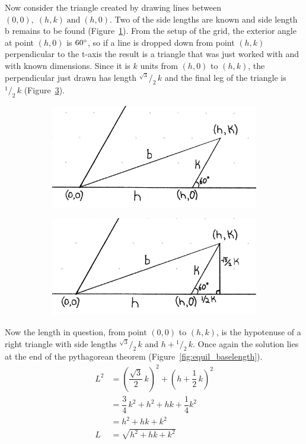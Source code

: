 \documentclass[12pt,letter]{article}
\newcommand*\rfrac[2]{{}^{#1}\!/_{#2}}
\begin{document}
Now consider the triangle created by drawing lines between $(0,0), \; (h,k) \; \text{and} \; (h,0)$. Two of the side lengths are known and side length b remains to be found (Figure~\ref{fig:base_setup}). From the setup of the grid, the exterior angle at point $(h,0)$ is $60\degree$, so if a line is dropped down from point $(h,k)$ perpendicular to the t-axis the result is a triangle that was just worked with and with known dimensions. Since it is $k$ units from $(h,0)$ to $(h,k)$, the perpendicular just drawn has length $\rfrac{\sqrt{3}} {2} \, k$ and the final leg of the triangle is $\rfrac 1 2 \, k$ (Figure~\ref{fig:base_right}).

\begin{figure}[h]
	\centering
	\caption{Calculating the Base}
	\begin{subfigure}[h]{0.45\textwidth}
		\includegraphics[width=\textwidth]{ddagger1.pdf}
		\caption{}
		\label{fig:base_setup}
	\end{subfigure}
	\begin{subfigure}[h]{0.45\textwidth}
		\includegraphics[width=\textwidth]{ddagger2.pdf}
		\caption{}
		\label{fig:base_right}
	\end{subfigure}
\end{figure}

Now the length in question, from point $(0,0)$ to $(h,k)$, is the hypotenuse of a right triangle with side lengths $\rfrac{\sqrt{3}} {2} \, k$ and $h+\rfrac 1 2 \, k$. Once again the solution lies at the end of the pythagorean theorem (Figure~\ref{fig:equil_baselength}).
\begin{align*}
L^2 &= \left(\dfrac{\sqrt{3}} {2} \, k\right)^2 + \left(h+\dfrac 1 2 \, k\right)^2 \\
&= \dfrac 3 4 \, k^2 + h^2 + hk + \dfrac 1 4 k^2 \\
& = h^2 + hk + k^2 \\
L & = \sqrt{h^2 + hk + k^2}
\end{align*}
\end{document}
